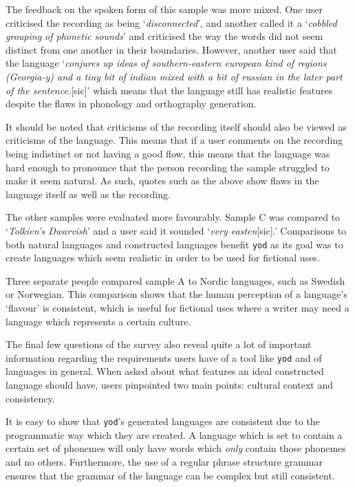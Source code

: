 \documentclass{report}
\begin{document}
	The feedback on the spoken form of this sample was more mixed. One user criticised the recording as being `\textit{disconnected}', and another called it a `\textit{cobbled grouping of phonetic sounds}' and criticised the way the words did not seem distinct from one another in their boundaries. However, another user said that the language `\textit{conjures up ideas of southern-eastern european kind of regions (Georgia-y) and a tiny bit of indian mixed with a bit of russian in the later part of the sentence.}[sic]' which means that the language still has realistic features despite the flaws in phonology and orthography generation.
	
	It should be noted that criticisms of the recording itself should also be viewed as criticisms of the language. This means that if a user comments on the recording being indistinct or not having a good flow, this means that the language was hard enough to pronounce that the person recording the sample struggled to make it seem natural. As such, quotes such as the above show flaws in the language itself as well as the recording.
	
	The other samples were evaluated more favourably. Sample C was compared to `\textit{Tolkien's Dwarvish}' and a user said it sounded `\textit{very easten}[sic].' Comparisons to both natural languages and constructed languages benefit \texttt{yod} as its goal was to create languages which seem realistic in order to be used for fictional uses.
	
	Three separate people compared sample A to Nordic languages, such as Swedish or Norwegian. This comparison shows that the human perception of a language's `flavour' is consistent, which is useful for fictional uses where a writer may need a language which represents a certain culture.
	
	The final few questions of the survey also reveal quite a lot of important information regarding the requirements users have of a tool like \texttt{yod} and of languages in general. When asked about what features an ideal constructed language should have, users pinpointed two main points: cultural context and consistency. 
	
	It is easy to show that \texttt{yod}'s generated languages are consistent due to the programmatic way which they are created. A language which is set to contain a certain set of phonemes will only have words which \textit{only} contain those phonemes and no others. Furthermore, the use of a regular phrase structure grammar ensures that the grammar of the language can be complex but still consistent.
	
\end{document}
